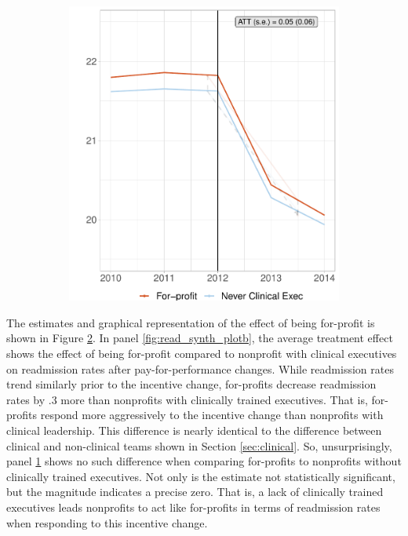 \documentclass[12pt]{article}
\begin{document}
\begin{figure}[ht!]
\begin{subfigure}[b]{0.45\textwidth}
         \includegraphics[width=\textwidth]{Objects/fp_read_nomd_synth_graph.pdf}
         \label{fig:read_synth_plotc}
     \end{subfigure}
        \label{fig:read_synth_plot}
    \end{figure}

    The estimates and graphical representation of the effect of being for-profit is shown in Figure \ref{fig:read_synth_plot}. In panel \ref{fig:read_synth_plotb}, the average treatment effect shows the effect of being for-profit compared to nonprofit with clinical executives on readmission rates after pay-for-performance changes. While readmission rates trend similarly prior to the incentive change, for-profits decrease readmission rates by .3 more than nonprofits with clinically trained executives. That is, for-profits respond more aggressively to the incentive change than nonprofits with clinical leadership. This difference is nearly identical to the difference between clinical and non-clinical teams shown in Section \ref{sec:clinical}. So, unsurprisingly, panel \ref{fig:read_synth_plotc} shows no such difference when comparing for-profits to nonprofits without clinically trained executives. Not only is the estimate not statistically significant, but the magnitude indicates a precise zero. That is, a lack of clinically trained executives leads nonprofits to act like for-profits in terms of readmission rates when responding to this incentive change. 
\end{document}
